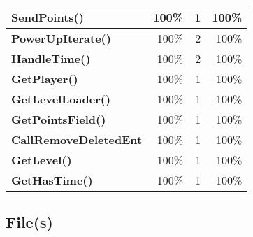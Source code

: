 \documentclass[a4paper,landscape,10pt]{article}
\begin{document}
\begin{longtable}[l]{|l|r|r|r|}
\hline
\textbf{SendPoints()} & 100\% & 1 & 100\%\\
\hline
\textbf{PowerUpIterate()} & 100\% & 2 & 100\%\\
\hline
\textbf{HandleTime()} & 100\% & 2 & 100\%\\
\hline
\textbf{GetPlayer()} & 100\% & 1 & 100\%\\
\hline
\textbf{GetLevelLoader()} & 100\% & 1 & 100\%\\
\hline
\textbf{GetPointsField()} & 100\% & 1 & 100\%\\
\hline
\textbf{CallRemoveDeletedEnt} & 100\% & 1 & 100\%\\
\hline
\textbf{GetLevel()} & 100\% & 1 & 100\%\\
\hline
\textbf{GetHasTime()} & 100\% & 1 & 100\%\\
\hline
\end{longtable}
\subsection{File(s)}
\end{document}
